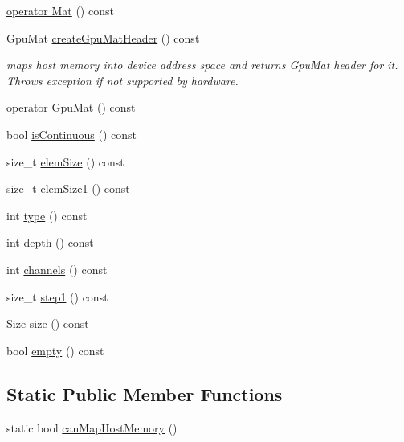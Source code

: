 \begin{DoxyCompactItemize}
\hyperlink{classcv_1_1gpu_1_1CudaMem_a03e7a78bbe48f7b4ee41885489e9bc28}{operator Mat} () const 
\item 
Gpu\-Mat \hyperlink{classcv_1_1gpu_1_1CudaMem_add035cf3265ca95214f8784b0cf18b64}{create\-Gpu\-Mat\-Header} () const 
\begin{DoxyCompactList}\small\item\em maps host memory into device address space and returns Gpu\-Mat header for it. Throws exception if not supported by hardware. \end{DoxyCompactList}\item 
\hyperlink{classcv_1_1gpu_1_1CudaMem_aef3e4de037efe4cea7e10f38c0875ae7}{operator Gpu\-Mat} () const 
\item 
bool \hyperlink{classcv_1_1gpu_1_1CudaMem_a334ec54e5b1086d7a154f5c7da2f6556}{is\-Continuous} () const 
\item 
size\-\_\-t \hyperlink{classcv_1_1gpu_1_1CudaMem_ad84c57ca42ee1f6c9196769e1e724d32}{elem\-Size} () const 
\item 
size\-\_\-t \hyperlink{classcv_1_1gpu_1_1CudaMem_a729ac09e04d65f3ed37ec500c410d144}{elem\-Size1} () const 
\item 
int \hyperlink{classcv_1_1gpu_1_1CudaMem_a9c4563cc629d2ccbe8397f85015db109}{type} () const 
\item 
int \hyperlink{classcv_1_1gpu_1_1CudaMem_a8544f4ffa4910783ad7eba1ac5be76ea}{depth} () const 
\item 
int \hyperlink{classcv_1_1gpu_1_1CudaMem_a2e0940d9e494481a3b068a8ab0863c9c}{channels} () const 
\item 
size\-\_\-t \hyperlink{classcv_1_1gpu_1_1CudaMem_a02b95d643869c246ca8d266843257004}{step1} () const 
\item 
Size \hyperlink{classcv_1_1gpu_1_1CudaMem_a5d79b4ec776ed1de0053ecd30b7b8b73}{size} () const 
\item 
bool \hyperlink{classcv_1_1gpu_1_1CudaMem_a42cbd174010cadc5da96cc2550c4e69b}{empty} () const 
\end{DoxyCompactItemize}
\subsection*{Static Public Member Functions}
\begin{DoxyCompactItemize}
\item 
static bool \hyperlink{classcv_1_1gpu_1_1CudaMem_ab89a9c3682470cebc9d165b698919b48}{can\-Map\-Host\-Memory} ()
\end{DoxyCompactItemize}
